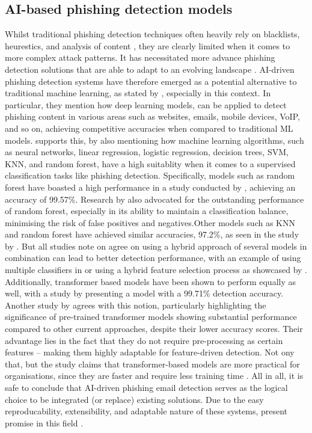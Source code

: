 \subsection*{AI-based phishing detection models}

Whilst traditional phishing detection techniques often heavily rely on blacklists, heurestics, and analysis of content \citep{sheng2009empirical}, they are clearly limited when it comes to more complex attack patterns. It has necessitated more advance phishing detection solutions that are able to adapt to an evolving landscape \citep{andriu2023adaptive}. AI-driven phishing detection systems have therefore emerged as a potential alternative to traditional machine learning, as stated by \cite{do2022deep}, especially in this context. In particular, they mention how deep learning models, can be applied to detect phishing content in various areas such as websites, emails, mobile devices, VoIP, and so on, achieving competitive accuracies when compared to traditional ML models. \cite{tang2021survey} supports this, by also mentioning how machine learning algorithms, such as neural networks, linear regression, logistic regression, decision trees, SVM, KNN, and random forest, have a high suitablity when it comes to a supervised classification tasks like phishing detection. Specifically, models such as random forest have boasted a high performance in a study conducted by \cite{gupta2021novel}, achieving an accuracy of 99.57\%. Research by \citep{kapoor2024comparative} also advocated for the outstanding performance of random forest, especially in its ability to maintain a classification balance, minimising the risk of false positives and negatives.Other models such as KNN and random forest have achieved similar accuracies, 97.2\%, as seen in the study by \cite{zamir2020phishing}. But all studies note on agree on using a hybrid approach of several models in combination can lead to better detection performance, with an example of using multiple classifiers in \cite{alsariera2020ai} or using a hybrid feature selection process as showcased by \cite{hamid2013using}. Additionally, transformer based models have been shown to perform equally as well, with a study by \cite{do2024integrated} presenting a model with a 99.71\% detection accuracy. Another study by \cite{shirazi2022towards} agrees with this notion, particularly highlighting the significance of pre-trained transformer models showing substantial performance compared to other current approaches, despite their lower accuracy scores. Their advantage lies in the fact that they do not require pre-processing as certain features -- making them highly adaptable for feature-driven detection. Not ony that, but the study claims that transformer-based models are more practical for organisations, since they are faster and require less training time \citep{shirazi2022towards}. All in all, it is safe to conclude that AI-driven phishing email detection serves as the logical choice to be integrated (or replace) existing solutions. Due to the easy reproducability, extensibility, and adaptable nature of these systems, present promise in this field \citep{bauskar2024ai}.

